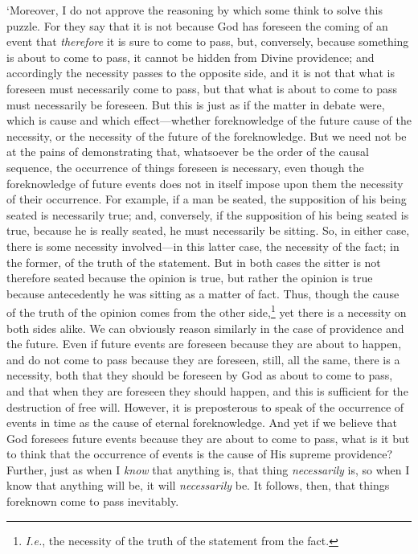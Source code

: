 \documentclass[12pt]{book}
\begin{document}
`Moreover, I do not approve the reasoning by which some think to solve
this puzzle. For they say that it is not because God has foreseen the
coming of an event that \emph{therefore} it is sure to come to pass, but,
conversely, because something is about to come to pass, it cannot be
hidden from Divine providence; and accordingly the necessity passes to
the opposite side, and it is not that what is foreseen must necessarily
come to pass, but that what is about to come to pass must necessarily be
foreseen. But this is just as if the matter in debate were, which is
cause and which effect---whether foreknowledge of the future cause of the
necessity, or the necessity of the future of the foreknowledge. But we
need not be at the pains of demonstrating that, whatsoever be the order
of the causal sequence, the occurrence of things foreseen is necessary,
even though the foreknowledge of future events does not in itself
impose upon them the necessity of their occurrence. For example, if a
man be seated, the supposition of his being seated is necessarily true;
and, conversely, if the supposition of his being seated is true, because
he is really seated, he must necessarily be sitting. So, in either case,
there is some necessity involved---in this latter case, the necessity of
the fact; in the former, of the truth of the statement. But in both
cases the sitter is not therefore seated because the opinion is true,
but rather the opinion is true because antecedently he was sitting as a
matter of fact. Thus, though the cause of the truth of the opinion comes
from the other side,\footnote{\emph{I.e.}, the necessity of the truth of the statement from the fact.}
yet there is a necessity on both sides alike. We
can obviously reason similarly in the case of providence and the future.
Even if future events are foreseen because they are about to happen, and
do not come to pass because they are foreseen, still, all the same,
there is a necessity, both that they should be foreseen by God as about
to come to pass, and that when they are foreseen they should happen, and
this is sufficient for the destruction of free will. However, it is
preposterous to speak of the occurrence of events in time as the cause
of eternal foreknowledge. And yet if we believe that God foresees future
events because they are about to come to pass, what is it but to think
that the occurrence of events is the cause of His supreme providence?
Further, just as when I \emph{know} that anything is, that thing
\emph{necessarily} is, so when I know that anything will be, it will
\emph{necessarily} be. It follows, then, that things foreknown come to pass
inevitably.
\end{document}
